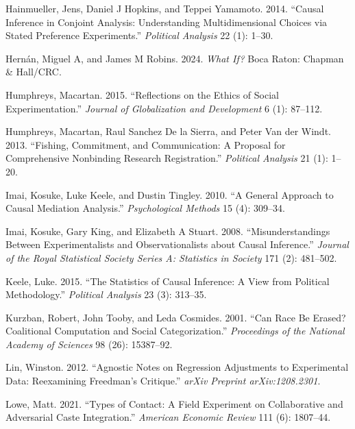 \documentclass[
  10pt,
  a4paper,10pt]{extarticle}
\newlength{\cslhangindent}
\newenvironment{CSLReferences}[2] %
 {\begin{list}{}{%
  \setlength{\itemindent}{0pt}
  \setlength{\leftmargin}{0pt}
  \setlength{\parsep}{0pt}
  \ifodd #1
   \setlength{\leftmargin}{\cslhangindent}
   \setlength{\itemindent}{-1\cslhangindent}
  \fi
  \setlength{\itemsep}{#2\baselineskip}}}
 {\end{list}}
\begin{document}
\begin{CSLReferences}{1}{0}
Hainmueller, Jens, Daniel J Hopkins, and Teppei Yamamoto. 2014.
{``Causal Inference in Conjoint Analysis: Understanding Multidimensional
Choices via Stated Preference Experiments.''} \emph{Political Analysis}
22 (1): 1--30.

Hernán, Miguel A, and James M Robins. 2024. \emph{What If?} Boca Raton:
Chapman \& Hall/CRC.

Humphreys, Macartan. 2015. {``Reflections on the Ethics of Social
Experimentation.''} \emph{Journal of Globalization and Development} 6
(1): 87--112.

Humphreys, Macartan, Raul Sanchez De la Sierra, and Peter Van der Windt.
2013. {``Fishing, Commitment, and Communication: A Proposal for
Comprehensive Nonbinding Research Registration.''} \emph{Political
Analysis} 21 (1): 1--20.

Imai, Kosuke, Luke Keele, and Dustin Tingley. 2010. {``A General
Approach to Causal Mediation Analysis.''} \emph{Psychological Methods}
15 (4): 309--34.

Imai, Kosuke, Gary King, and Elizabeth A Stuart. 2008.
{``Misunderstandings Between Experimentalists and Observationalists
about Causal Inference.''} \emph{Journal of the Royal Statistical
Society Series A: Statistics in Society} 171 (2): 481--502.

Keele, Luke. 2015. {``The Statistics of Causal Inference: A View from
Political Methodology.''} \emph{Political Analysis} 23 (3): 313--35.

Kurzban, Robert, John Tooby, and Leda Cosmides. 2001. {``Can Race Be
Erased? Coalitional Computation and Social Categorization.''}
\emph{Proceedings of the National Academy of Sciences} 98 (26):
15387--92.

Lin, Winston. 2012. {``Agnostic Notes on Regression Adjustments to
Experimental Data: Reexamining Freedman's Critique.''} \emph{arXiv
Preprint arXiv:1208.2301}.

Lowe, Matt. 2021. {``Types of Contact: A Field Experiment on
Collaborative and Adversarial Caste Integration.''} \emph{American
Economic Review} 111 (6): 1807--44.


\end{CSLReferences}
\end{document}
